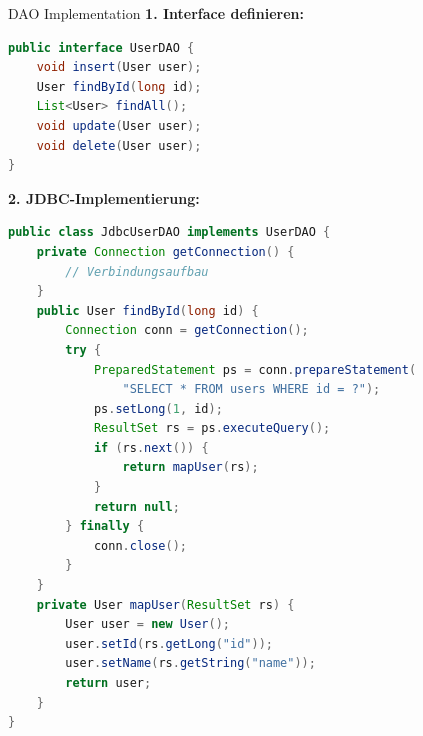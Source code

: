 \begin{example2}{DAO Implementation}
\textbf{1. Interface definieren:}
\begin{lstlisting}[language=Java, style=basesmol]
public interface UserDAO {
    void insert(User user);
    User findById(long id);
    List<User> findAll();
    void update(User user);
    void delete(User user);
}
\end{lstlisting}

\textbf{2. JDBC-Implementierung:}
\begin{lstlisting}[language=Java, style=basesmol]
public class JdbcUserDAO implements UserDAO {
    private Connection getConnection() {
        // Verbindungsaufbau
    }
    public User findById(long id) {
        Connection conn = getConnection();
        try {
            PreparedStatement ps = conn.prepareStatement(
                "SELECT * FROM users WHERE id = ?");
            ps.setLong(1, id);
            ResultSet rs = ps.executeQuery();
            if (rs.next()) {
                return mapUser(rs);
            }
            return null;
        } finally {
            conn.close();
        }
    }
    private User mapUser(ResultSet rs) {
        User user = new User();
        user.setId(rs.getLong("id"));
        user.setName(rs.getString("name"));
        return user;
    }
}
\end{lstlisting}
\end{example2}



